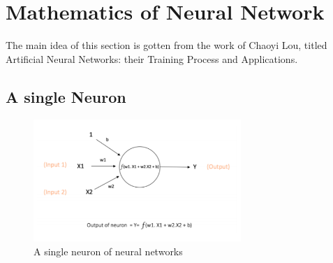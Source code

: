 \documentclass[a4paper,11pt,oneside]{book}
\begin{document}

\section{Mathematics of Neural Network}
The main idea of this section is gotten from the work of Chaoyi Lou, titled Artificial Neural Networks:
their Training Process and Applications.

\subsection{A single Neuron}
\begin{figure}[!h]
	\centering
	\includegraphics[width=0.7\textwidth]{figures/neuron}
	\caption{A single neuron of neural networks}
	\label{secondfig}
\end{figure}
\end{document}

